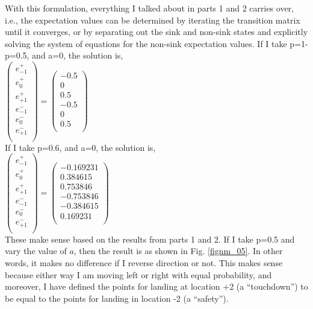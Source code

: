 \documentclass{article}
\begin{document}
With this formulation, everything I talked about in parts 1 and 2 carries over, i.e., the expectation values can be determined by iterating the transition matrix until it converges, or by separating out the sink and non-sink states and explicitly solving the system of equations for the non-sink expectation values. If I take p=1-p=0.5, and a=0, the solution is, \\

$
\left(
\begin{array}{c}
 e^{+}_{-1} \\
 e^{+}_{0} \\
 e^{+}_{+1} \\
 e^{-}_{-1} \\
 e^{-}_{0} \\
 e^{-}_{+1} \\
\end{array}
\right) =
\left(
\begin{array}{c}
 -0.5 \\
 0 \\
 0.5 \\
 -0.5 \\
 0 \\
 0.5 \\
\end{array}
\right)
$ \\

If I take p=0.6, and a=0, the solution is, \\

$
\left(
\begin{array}{c}
 e^{+}_{-1} \\
 e^{+}_{0} \\
 e^{+}_{+1} \\
 e^{-}_{-1} \\
 e^{-}_{0} \\
 e^{-}_{+1} \\
\end{array}
\right) =
\left(
\begin{array}{c}
 -0.169231 \\
 0.384615 \\
 0.753846 \\
 -0.753846 \\
 -0.384615 \\
 0.169231 \\
\end{array}
\right)
$ \\

These make sense based on the results from parts 1 and 2. If I take p=0.5 and vary the value of $a$, then the result is as shown in Fig. \ref{fignm_05}. In other words, it makes no difference if I reverse direction or not. This makes sense because either way I am moving left or right with equal probability, and moreover, I have defined the points for landing at location +2 (a ``touchdown'') to be equal to the points for landing in location -2 (a ``safety''). \\
\end{document}
